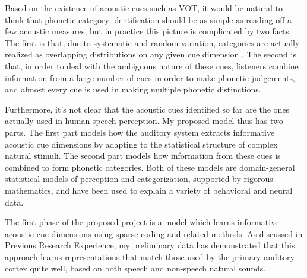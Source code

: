 \documentclass[12pt]{article}
\begin{document}
Based on the existence of acoustic cues such as VOT, it would be natural to think that phonetic category identification should be as simple as reading off a few acoustic measures, but in practice this picture is complicated by two facts.  The first is that, due to systematic and random variation, categories are actually realized as overlapping distributions on any given cue dimension \cite{Hillenbrand1995}.  The second is that, in order to deal with the ambiguous nature of these cues, listeners combine information from a large number of cues in order to make phonetic judgements, and almost every cue is used in making multiple phonetic distinctions.  


Furthermore, it's not clear that the acoustic cues identified so far are the ones actually used in human speech perception.  My proposed model thus has two parts.  The first part models how the auditory system extracts informative acoustic cue dimensions by adapting to the statistical structure of complex natural stimuli.  The second part models how information from these cues is combined to form phonetic categories.  Both of these models are domain-general statistical models of perception and categorization, supported by rigorous mathematics, and have been used to explain a variety of behavioral and neural data.

The first phase of the proposed project is a model which learns informative acoustic cue dimensions using sparse coding and related methods.  As discussed in Previous Research Experience, my preliminary data\cite{Kleinschmidt2010} has demonstrated that this approach learns representations that match those used by the primary auditory cortex quite well, based on both speech and non-speech natural sounds.

\end{document}
